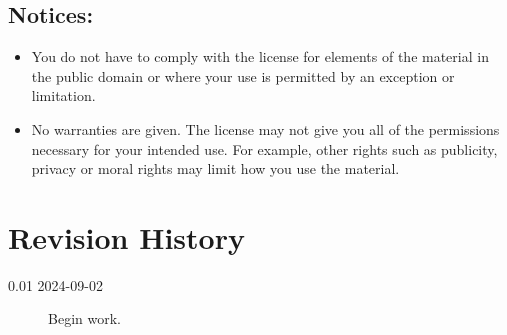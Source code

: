 \documentclass[letterpaper,twoside]{article}
\begin{document}
\subsection{Notices:}
\begin{itemize}
\item{You do not have to comply with the license for elements of the
  material in the public domain or where your use is permitted by an
  exception or limitation.}
\item{No warranties are given.  The license may not give you all of the
  permissions necessary for your intended use.  For example, other rights
  such as publicity, privacy or moral rights may limit how you use the
  material.}
\end{itemize}

\section{Revision History}

\begin{description}
  \item[0.01 2024-09-02]Begin work.
\end{description}


\end{document}
